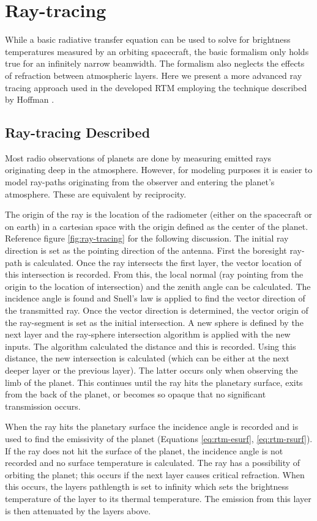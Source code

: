 \section{Ray-tracing}
While a basic radiative transfer equation can be used to solve for brightness temperatures measured by an orbiting spacecraft, the basic formalism only holds true for an infinitely narrow beamwidth. The formalism also neglects the effects of refraction between atmospheric layers. Here we present a more advanced ray tracing approach used in the developed RTM employing the technique described by Hoffman \cite{Hoffman-thesis}.
\subsection{Ray-tracing Described}
Most radio observations of planets are done by measuring emitted rays originating deep in the atmosphere. However, for modeling purposes it is easier to model ray-paths originating from the observer and entering the planet's atmosphere. These are equivalent by reciprocity.

The origin of the ray is the location of the radiometer (either on the spacecraft or on earth) in a cartesian space with the origin defined as the center of the planet. Reference figure \ref{fig:ray-tracing} for the following discussion. The initial ray direction is set as the pointing direction of the antenna. First the boresight ray-path is calculated.  Once the ray intersects the first layer, the vector location of this intersection is recorded. From this, the local normal (ray pointing from the origin to the location of intersection) and the zenith angle can be calculated. The incidence angle is found and Snell's law is applied to find the vector direction of the transmitted ray. Once the vector direction is determined, the vector origin of the ray-segment is set as the initial intersection. A new sphere is defined by the next layer and the ray-sphere intersection algorithm is applied with the new inputs. The algorithm calculated the distance and this is recorded. Using this distance, the new intersection is calculated (which can be either at the next deeper layer or the previous layer). The latter occurs only when observing the limb of the planet. This continues until the ray hits the planetary surface, exits from the back of the planet, or becomes so opaque that no significant transmission occurs. 

When the ray hits the planetary surface the incidence angle is recorded and is used to find the emissivity of the planet (Equations \ref{eq:rtm-esurf}, \ref{eq:rtm-rsurf}). If the ray does not hit the surface of the planet, the incidence angle is not recorded and no surface temperature is calculated. The ray has a possibility of orbiting the planet; this occurs if the next layer causes critical refraction. When this occurs, the layers pathlength is set to infinity which sets the brightness temperature of the layer to its thermal temperature. The emission from this layer is then attenuated by the layers above.

